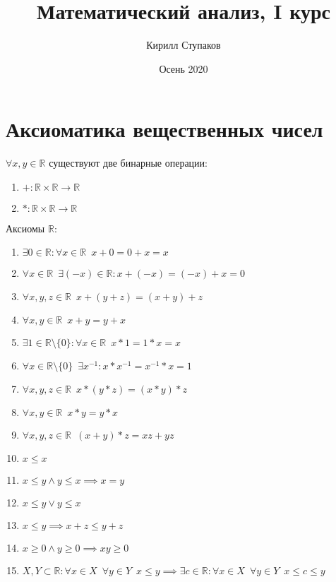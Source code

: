 \documentclass[11pt, a4paper, utf-8]{article}
\title{Математический анализ, I курс}
\author{Кирилл Ступаков}
\date{Осень 2020}
\def\R{\mathbb{R}}
\def\sp{\, \, \,}
\begin{document}
    \maketitle \pagebreak
    \tableofcontents \pagebreak

    \section{Аксиоматика вещественных чисел}
    $\forall x,y \in \R$ существуют две бинарные операции:
    \begin{enumerate}
        \item $+: \R \times \R \to \R$
        \item $*: \R \times \R \to \R$
    \end{enumerate}

    Аксиомы $\R$:
    \begin{enumerate}
        \item $\exists 0 \in \R : \forall x \in \R \sp x + 0 = 0 + x = x$
        \item $\forall x \in \R \sp \exists (-x) \in \R: x + (-x) = (-x) + x = 0$
        \item $\forall x,y,z \in \R \sp x+(y+z)=(x+y)+z$
        \item $\forall x,y \in \R \sp x+y = y+x$
        \item $\exists 1 \in \R \setminus \{0\}: \forall x \in \R \sp x*1 = 1*x = x$
        \item $\forall x \in \R \setminus \{0\} \sp \exists x^{-1}: x*x^{-1} = x^{-1}*x = 1$
        \item $\forall x,y,z \in \R \sp x*(y*z)=(x*y)*z$
        \item $\forall x,y \in \R \sp x*y = y*x$
        \item $\forall x,y,z \in \R \sp (x+y)*z=xz + yz$
        \item $x \leq x$
        \item $x \leq y \land y \leq x \implies x = y$
        \item $x \leq y \lor y \leq x$
        \item $x \leq y \implies x+z \leq y+z$
        \item $x \geq 0 \land y \geq 0 \implies xy \geq 0$
        \item $X, Y \subset \R: \forall x \in X \sp \forall y \in Y \sp x \leq y \implies \exists c \in \R: \forall x \in X \sp \forall y \in Y \sp x \leq c \leq y$
    \end{enumerate}
\end{document}
